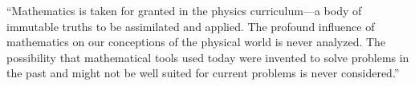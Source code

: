 \documentclass[preview]{standalone}
\begin{document}
\begin{justify}
``Mathematics is taken for granted in the physics curriculum—a body of immutable truths to be assimilated and applied. The profound influence of mathematics on our conceptions of the physical world is never analyzed. The possibility that mathematical tools used today were invented to solve problems in the past and might not be well suited for current problems is never considered.''
\end{justify}
\end{document}
